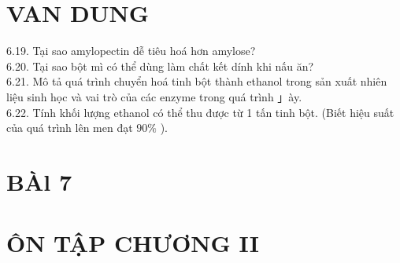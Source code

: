 \documentclass[10pt]{article}
\begin{document}
\section*{VAN DUNG}
6.19. Tại sao amylopectin dễ tiêu hoá hơn amylose?\\
6.20. Tại sao bột mì có thể dùng làm chất kết dính khi nấu ăn?\\
6.21. Mô tả quá trình chuyển hoá tinh bột thành ethanol trong sản xuất nhiên liệu sinh học và vai trò của các enzyme trong quá trình 」ày.\\
6.22. Tính khối lượng ethanol có thể thu được từ 1 tấn tinh bột. (Biết hiệu suất của quá trình lên men đạt $90 \%$ ).

\section*{BÀl 7}
\section*{ÔN TẬP CHƯƠNG II}
\end{document}
